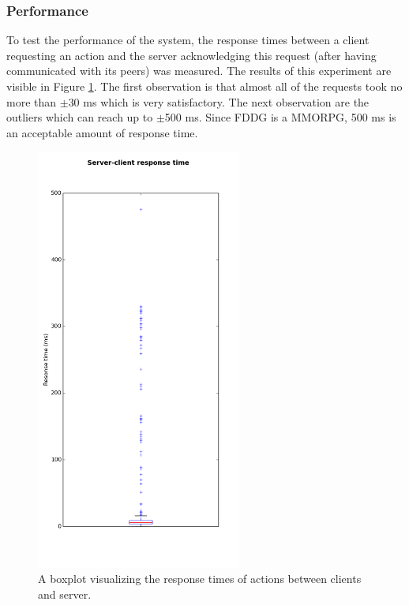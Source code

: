 	\subsubsection{Performance}
	\label{subsubsec:performance}
		To test the performance of the system, the response times between a client requesting an action and the server acknowledging this request (after having communicated with its peers) was measured. 
		The results of this experiment are visible in Figure \ref{fig:boxplot_response_times}.
		The first observation is that almost all of the requests took no more than $\pm$30 ms which is very satisfactory. 
		The next observation are the outliers which can reach up to $\pm$500 ms.
		Since FDDG is a MMORPG, 500 ms is an acceptable amount of response time.
		
		\begin{figure}[h!]
		  \centering
		    \includegraphics[width=0.6\textwidth, height=0.59\textheight]{images/boxplot_response_times}
		    
		  \caption{A boxplot visualizing the response times of actions between clients and server.}
		  \label{fig:boxplot_response_times}
		\end{figure}
		
